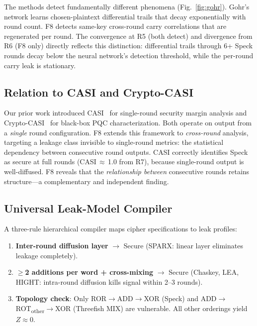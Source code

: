 \documentclass[conference,a4paper]{IEEEtran}
\begin{document}
The methods detect fundamentally different phenomena (Fig.~\ref{fig:gohr}). Gohr's network learns chosen-plaintext differential trails that decay exponentially with round count. F8 detects same-key cross-round carry correlations that are regenerated per round. The convergence at R5 (both detect) and divergence from R6 (F8 only) directly reflects this distinction: differential trails through 6+ Speck rounds decay below the neural network's detection threshold, while the per-round carry leak is stationary.

\subsection{Relation to CASI and Crypto-CASI}

Our prior work introduced CASI~\cite{foss2026crypto} for single-round security margin analysis and Crypto-CASI~\cite{foss2026artifact} for black-box PQC characterization. Both operate on output from a \emph{single} round configuration. F8 extends this framework to \emph{cross-round} analysis, targeting a leakage class invisible to single-round metrics: the statistical dependency between consecutive round outputs. CASI correctly identifies Speck as secure at full rounds (CASI\,$\approx$\,1.0 from R7), because single-round output is well-diffused. F8 reveals that the \emph{relationship between} consecutive rounds retains structure---a complementary and independent finding.

\subsection{Universal Leak-Model Compiler}

A three-rule hierarchical compiler maps cipher specifications to leak profiles:

\begin{enumerate}[nosep]
\item \textbf{Inter-round diffusion layer} $\to$ Secure (SPARX: linear layer eliminates leakage completely).
\item \textbf{$\geq$2 additions per word + cross-mixing} $\to$ Secure (Chaskey, LEA, HIGHT: intra-round diffusion kills signal within 2--3 rounds).
\item \textbf{Topology check}: Only ROR$\to$ADD$\to$XOR (Speck) and ADD$\to$ROT\textsubscript{other}$\to$XOR (Threefish MIX) are vulnerable. All other orderings yield $Z \approx 0$.
\end{enumerate}
\end{document}
